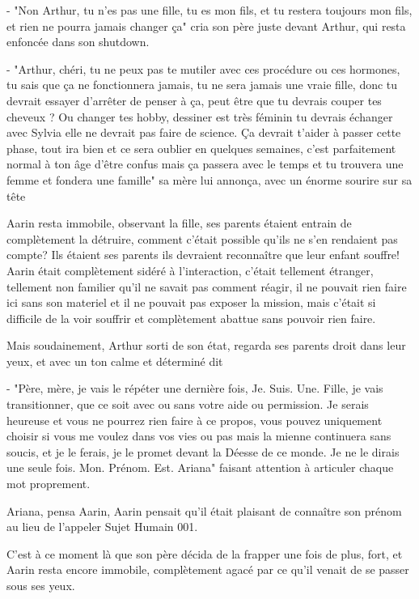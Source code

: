 \documentclass[12pt,colorlinks,a4paper]{book}
\begin{document}
- "Non Arthur, tu n'es pas une fille, tu es mon fils, et tu restera toujours mon fils, et rien ne pourra 
jamais changer ça" cria son père juste devant Arthur, qui resta enfoncée dans son shutdown.\par 
- "Arthur, chéri, tu ne peux pas te mutiler avec ces procédure ou ces hormones, tu sais que ça ne fonctionnera 
jamais, tu ne sera jamais une vraie fille, donc tu devrait essayer d'arrêter de penser à ça, peut être que tu 
devrais couper tes cheveux ? Ou changer tes hobby, dessiner est très féminin tu devrais échanger avec Sylvia elle ne 
devrait pas faire de science. Ça devrait t'aider à passer cette phase, tout ira bien et ce sera oublier en quelques semaines,
c'est parfaitement normal à ton âge d'être confus mais ça passera avec le temps et tu trouvera une femme et fondera une famille"
sa mère lui annonça, avec un énorme sourire sur sa tête \par 
\bigskip

Aarin resta immobile, observant la fille, ses parents étaient entrain de complètement la détruire, comment c'était possible 
qu'ils ne s'en rendaient pas compte? Ils étaient ses parents ils devraient reconnaître que leur enfant souffre! Aarin était 
complètement sidéré à l'interaction, c'était tellement étranger, tellement non familier qu'il ne savait pas comment réagir,
il ne pouvait rien faire ici sans son materiel et il ne pouvait pas exposer la mission, mais c'était si difficile de la voir 
souffrir et complètement abattue sans pouvoir rien faire.\par 
\bigskip

Mais soudainement, Arthur sorti de son état, regarda ses parents droit dans leur yeux, et avec un ton calme et déterminé dit\par
- "Père, mère, je vais le répéter une dernière fois, Je. Suis. Une. Fille, je vais transitionner, que ce soit avec ou sans votre
aide ou permission. Je serais heureuse et vous ne pourrez rien faire à ce propos, vous pouvez uniquement choisir si vous 
me voulez dans vos vies ou pas mais la mienne continuera sans soucis, et je le ferais, je le promet devant la Déesse de ce monde. 
Je ne le dirais une seule fois. Mon. Prénom. Est. Ariana" faisant attention à articuler chaque mot proprement.\par 
\bigskip

Ariana, pensa Aarin, Aarin pensait qu'il était plaisant de connaître son prénom au lieu de l'appeler Sujet Humain 001. \par 
\bigskip
C'est à ce moment là que son père décida de la frapper une fois de plus, fort, et Aarin resta encore immobile, complètement 
agacé par ce qu'il venait de se passer sous ses yeux.\par 
\bigskip
\end{document}
